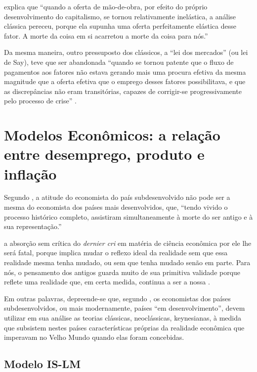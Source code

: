 \documentclass[
	10pt,				%
	openright,			%
	twoside,			%
	a5paper,			%
	english,			%
	french,				%
	spanish,			%
	brazil				%
	]{abntex2}
\renewenvironment{quote}
  {\small\list{}{\rightmargin=0.1cm \leftmargin=4cm}%
   \item\relax}
  {\endlist}
\begin{document}
 explica que ``quando a oferta de
mão-de-obra, por efeito do próprio desenvolvimento do capitalismo, se
tornou relativamente inelástica, a análise clássica pereceu, porque ela
supunha uma oferta perfeitamente elástica desse fator. A morte da coisa
em si acarretou a morte da coisa para nós.''

Da mesma maneira, outro pressuposto dos clássicos, a ``lei dos
mercados'' (ou lei de Say), teve que ser abandonada ``quando se tornou
patente que o fluxo de pagamentos aos fatores não estava gerando mais
uma procura efetiva da mesma magnitude que a oferta efetiva que o
emprego desses fatores possibilitava, e que as discrepâncias não eram
transitórias, capazes de corrigir-se progressivamente pelo processo de
crise'' \cite[p.~206]{rangel1956}.

\section{Modelos Econômicos: a relação entre desemprego, produto e
inflação}\label{sec:modelos}

Segundo , a atitude do economista do país
subdesenvolvido não pode ser a mesma do economista dos países mais
desenvolvidos, que, ``tendo vivido o processo histórico completo,
assistiram simultaneamente à morte do ser antigo e à sua
representação.''

\begin{quote}
a absorção sem crítica do \emph{dernier cri} em matéria de ciência
econômica por ele lhe será fatal, porque implica mudar o reflexo ideal
da realidade sem que essa realidade mesma tenha mudado, ou sem que tenha
mudado senão em parte. Para nós, o pensamento dos antigos guarda muito
de sua primitiva validade porque reflete uma realidade que, em certa
medida, continua a ser a nossa \cite[p.~206-207]{rangel1956}.
\end{quote}

Em outras palavras, depreende-se que, segundo
, os economistas dos países
subdesenvolvidos, ou mais modernamente, países ``em desenvolvimento'',
devem utilizar em sua análise as teorias clássicas, neoclássicas,
keynesianas, à medida que subsistem nestes países características
próprias da realidade econômica que imperavam no Velho Mundo quando elas
foram concebidas.

\subsection{Modelo IS-LM}\label{modelo-is-lm}
\end{document}
